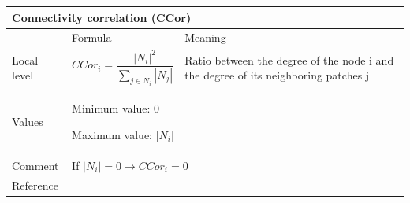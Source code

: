 \documentclass{article}
\begin{document}
\begin{table}[H]
\begin{tabular}{|m{3.24cm}|m{4.4810004cm}m{7.924cm}|}
\hline
\multicolumn{3}{|m{16.044998cm}|}{Connectivity correlation
(CCor)}\\\hline
 &
\multicolumn{1}{m{4.4810004cm}|}{Formula} &
Meaning\\\hline
Local level

 &
\multicolumn{1}{m{4.4810004cm}|}{\begin{equation*}
{\mathit{CCor}}_{i}=\frac{{\left|{N}_{i}\right|}^{2}}{\sum
_{j{\in}{N}_{i}}{\left|{N}_{j}\right|}}
\end{equation*}
} &
Ratio between the degree of the node i and the degree of its neighboring
patches j\\\hline
Values &
\multicolumn{2}{m{12.6050005cm}|}{Minimum value: 0

Maximum value:  $\left|{N}_{i}\right|$

}\\\hline
Comment &
\multicolumn{2}{m{12.6050005cm}|}{If $\left|{N}_{i}\right|=0\rightarrow
{\mathit{CCor}}_{i}=0$}\\\hline
Reference &
\multicolumn{2}{m{12.6050005cm}|}{\cite{Minor2008}}\\\hline
\end{tabular}
\end{table}

\pagebreak



\end{document}
